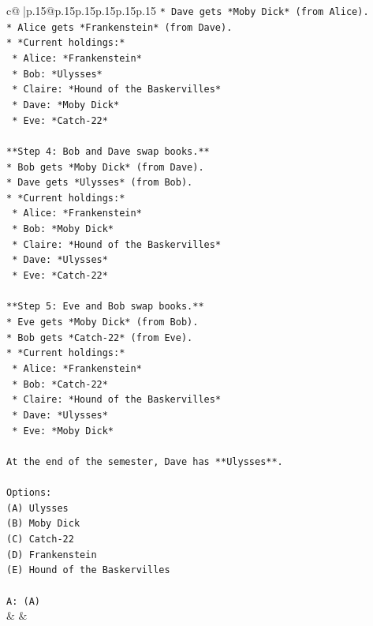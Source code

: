 \documentclass{article}
\begin{document}
{\begin{supertabular}{c@{$\;$}|p{.15\linewidth}@{}p{.15\linewidth}p{.15\linewidth}p{.15\linewidth}p{.15\linewidth}p{.15\linewidth}}
{{{\texttt{*   Dave gets *Moby Dick* (from Alice).} \\
\texttt{*   Alice gets *Frankenstein* (from Dave).} \\
\texttt{*   *Current holdings:*} \\
\texttt{    *   Alice: *Frankenstein*} \\
\texttt{    *   Bob: *Ulysses*} \\
\texttt{    *   Claire: *Hound of the Baskervilles*} \\
\texttt{    *   Dave: *Moby Dick*} \\
\texttt{    *   Eve: *Catch{-}22*} \\
\\ 
\texttt{**Step 4: Bob and Dave swap books.**} \\
\texttt{*   Bob gets *Moby Dick* (from Dave).} \\
\texttt{*   Dave gets *Ulysses* (from Bob).} \\
\texttt{*   *Current holdings:*} \\
\texttt{    *   Alice: *Frankenstein*} \\
\texttt{    *   Bob: *Moby Dick*} \\
\texttt{    *   Claire: *Hound of the Baskervilles*} \\
\texttt{    *   Dave: *Ulysses*} \\
\texttt{    *   Eve: *Catch{-}22*} \\
\\ 
\texttt{**Step 5: Eve and Bob swap books.**} \\
\texttt{*   Eve gets *Moby Dick* (from Bob).} \\
\texttt{*   Bob gets *Catch{-}22* (from Eve).} \\
\texttt{*   *Current holdings:*} \\
\texttt{    *   Alice: *Frankenstein*} \\
\texttt{    *   Bob: *Catch{-}22*} \\
\texttt{    *   Claire: *Hound of the Baskervilles*} \\
\texttt{    *   Dave: *Ulysses*} \\
\texttt{    *   Eve: *Moby Dick*} \\
\\ 
\texttt{At the end of the semester, Dave has **Ulysses**.} \\
\\ 
\texttt{Options:} \\
\texttt{(A) Ulysses} \\
\texttt{(B) Moby Dick} \\
\texttt{(C) Catch{-}22} \\
\texttt{(D) Frankenstein} \\
\texttt{(E) Hound of the Baskervilles} \\
\\ 
\texttt{A: (A)} \\
            }
        }
    }
    & & \\ \\


\end{supertabular}}
\end{document}
